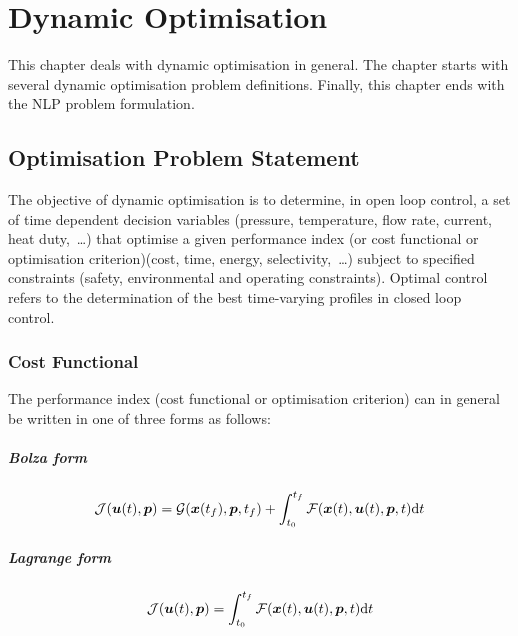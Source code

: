 \chapter{Dynamic Optimisation}
\label{cha:do}

This chapter deals with dynamic optimisation in general. The chapter
starts with several dynamic optimisation problem definitions. Finally,
this chapter ends with the NLP problem formulation. 

\section{Optimisation Problem Statement}
\label{sec:ops}

The objective of dynamic optimisation is to determine, in open loop
control, a set of time dependent decision variables (pressure,
temperature, flow rate, current, heat duty,~\ldots) that optimise a
given performance index (or cost functional or optimisation
criterion)(cost, time, energy, selectivity,~\ldots) subject to
specified constraints (safety, environmental and operating
constraints). Optimal control refers to the determination of the best
time-varying profiles in closed loop control.

\subsection{Cost Functional}
\label{sec:cf}

The performance index (cost functional or optimisation criterion) can
in general be written in one of three forms as follows:
\paragraph{Bolza form}
\begin{equation}
\mf{J}(\ve{u}(t),\ve{p}) = \mf{G}(\ve{x}(t_{f}),\ve{p},t_{f}) +
\int_{t_{0}}^{t_{f}}\mf{F}(\ve{x}(t),\ve{u}(t),\ve{p},t)\dt
\label{eq:bolza} 
\end{equation} 
\paragraph{Lagrange form}
\begin{equation}
\mf{J}(\ve{u}(t),\ve{p}) =
\int_{t_{0}}^{t_{f}}\mf{F}(\ve{x}(t),\ve{u}(t),\ve{p},t)\dt
\label{eq:lagrange}
\end{equation} 
